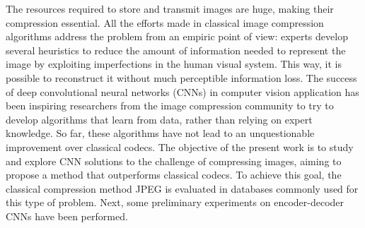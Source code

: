 The resources required to store and transmit images are huge, making their compression essential. All the efforts made in classical image compression algorithms address the problem from an empiric point of view: experts develop several heuristics to reduce the amount of information needed to represent the image by exploiting imperfections in the human visual system. This way, it is possible to reconstruct it without much perceptible information loss.
The success of deep convolutional neural networks (CNNs) in computer vision application has been inspiring researchers from the image compression community to try to develop algorithms that learn from data, rather than relying on expert knowledge. So far, these algorithms have not lead to an unquestionable improvement over classical codecs.
The objective of the present work is to study and explore CNN solutions to the challenge of compressing images, aiming to propose a method that outperforms classical codecs. To achieve this goal, the classical compression method JPEG is evaluated in databases commonly used for this type of problem. Next, some preliminary experiments on encoder-decoder CNNs have been performed.


